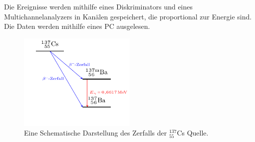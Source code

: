 Die Ereignisse werden mithilfe eines Diskriminators und eines Multichannelanalyzers in Kanälen gespeichert, die proportional zur Energie sind.
Die Daten werden mithilfe eines PC ausgelesen.
\begin{figure}[h!]
	\centering
	\includegraphics[width = 0.5\textwidth]{../Grafiken/Tikz/tikz-Energieschema.pdf}
	\caption{Eine Schematische Darstellung des Zerfalls der ${}^{137}_{55}$Cs Quelle.}\label{git:Energieschema}
\end{figure}